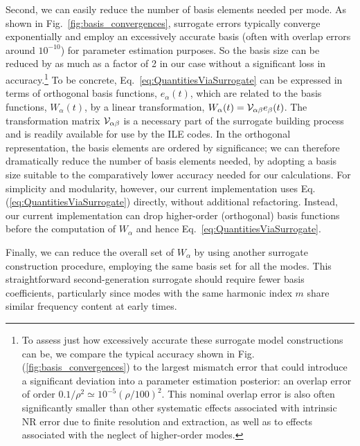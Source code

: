 \documentclass[aps,prd,nofootinbib,showpacs,amssymb,twocolumn]{revtex4}
\begin{document}
Second, we can easily reduce the number of basis elements
needed per mode.
%
As shown in Fig.~\ref{fig:basis_convergences}, surrogate errors typically converge
exponentially and employ an excessively accurate basis (often with overlap errors around $10^{-10}$) for parameter estimation purposes. So the basis size can be reduced by as much as a factor of 2 in our case
without a significant loss in accuracy.\footnote{To assess just how excessively accurate these surrogate model
  constructions can be, we compare the typical accuracy shown in Fig. (\ref{fig:basis_convergences}) to the largest mismatch error that could introduce a significant
  deviation into a parameter estimation posterior: an overlap error of order $0.1/\rho^2 \simeq 10^{-5}(\rho/100)^2$. This nominal overlap error
  is also often significantly smaller than other systematic effects associated with intrinsic NR error due to finite
  resolution and extraction, as well as to effects associated with the neglect of higher-order modes.} 
To be concrete, 
%
Eq.~\eqref{eq:QuantitiesViaSurrogate} can be
%
expressed in terms of orthogonal basis functions, $e_\alpha(t)$, which are related to the 
%
basis functions, $W_\alpha(t)$, by
a linear transformation, $W_\alpha(t) = {\cal V}_{\alpha \beta} e_\beta(t)$.
The transformation matrix ${\cal V}_{\alpha \beta}$ is a necessary part of the surrogate building process~\cite{2014PhRvX...4c1006F} and is readily available for use by the ILE codes. In the orthogonal representation, the
basis elements are ordered by significance; we can therefore dramatically reduce the number of basis elements needed, by
adopting a basis size suitable to the comparatively lower accuracy needed for our calculations.   
%
For simplicity and modularity, however, our current implementation uses Eq. (\ref{eq:QuantitiesViaSurrogate}) directly,
without additional refactoring. Instead, our current implementation can drop higher-order (orthogonal) basis functions before the
computation of $W_\alpha$ and hence Eq.~\eqref{eq:QuantitiesViaSurrogate}.

%
Finally, we can reduce the overall set of $W_{\alpha}$ by using another surrogate construction procedure, employing the
same basis set for all the modes.  This straightforward second-generation surrogate should require 
%
fewer basis coefficients, particularly since modes 
with the same harmonic index $m$ share similar frequency content at early times.
%
%
\end{document}
